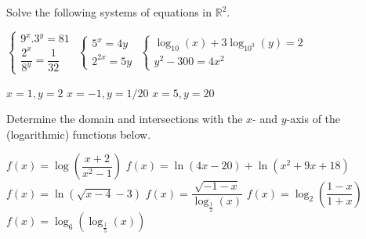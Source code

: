 \ifanalysis
\begin{Exercise} Solve the following systems of equations in $\mathbb{R}^2$.
\begin{multicols}{2}
	\Question[difficulty = 1] $\left\{ \begin{array}{l} 9^x.3^y = 81 \\
	\dfrac{2^x}{8^y} = \dfrac{1}{32} \end{array} \right.$
	\Question[difficulty = 2] $\left\{ \begin{array}{l} 5^x = 4y \\
	2^{2x} = 5y \end{array} \right.$
	\Question[difficulty = 2] $\left\{ \begin{array}{l} \log_{10}(x) + 3 \log_{10^3}(y) = 2 \\
	y^2-300=4x^2 \end{array} \right.$
    \EndCurrentQuestion
\end{multicols}	

\end{Exercise}

\begin{Answer}\phantom{}
    \begin{multicols}{2}
    
    \Question $x=1, y=2$
    \Question $x=-1, y=1/20$
    \Question $x=5,y=20$
    \EndCurrentQuestion
    \end{multicols}
\end{Answer}

\fi

\ifcalculus\pagebreak\fi

\begin{Exercise} Determine the domain and intersections with the $x$- and $y$-axis of the (logarithmic) functions below. 
\begin{multicols}{2}
    \Question[difficulty = 1] $f(x) = \log \left( \dfrac{x+2}{x^2-1} \right)$
    \Question[difficulty = 1] $f(x) = \ln (4x-20) + \ln \left( x^2+9x+18\right)$
    \Question[difficulty = 1] $f(x) = \ln \left( \sqrt{x-4} - 3\right)$
    \Question[difficulty = 1] $f(x) = \dfrac{\sqrt{-1-x}}{\log_{\frac{1}{2}} (x)}$
    \Question[difficulty = 1] $f(x)=\log_2 \left(\dfrac{1-x}{1+x} \right)$
    \Question[difficulty = 2] $f(x) = \log_6 \left(\log_{\frac{1}{5}} (x) \right)$
    \EndCurrentQuestion
\end{multicols}

\end{Exercise}

